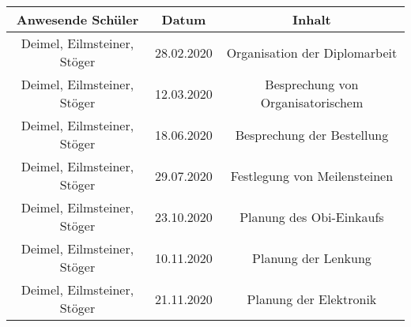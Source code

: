\begin{tabular}[h]{|c|c|c|}
    \hline
    \textbf{Anwesende Schüler} & \textbf{Datum}  & \textbf{Inhalt} \\
    \hline
    Deimel, Eilmsteiner, Stöger & 28.02.2020 & Organisation der Diplomarbeit \\
    \hline
    Deimel, Eilmsteiner, Stöger & 12.03.2020 & Besprechung von Organisatorischem \\
    \hline
    Deimel, Eilmsteiner, Stöger & 18.06.2020 & Besprechung der Bestellung \\
    \hline
    Deimel, Eilmsteiner, Stöger & 29.07.2020 & Festlegung von Meilensteinen \\
    \hline
    Deimel, Eilmsteiner, Stöger & 23.10.2020 & Planung des Obi-Einkaufs \\
    \hline
    Deimel, Eilmsteiner, Stöger & 10.11.2020 & Planung der Lenkung \\
    \hline 
    Deimel, Eilmsteiner, Stöger & 21.11.2020 & Planung der Elektronik \\
    \hline


\end{tabular}